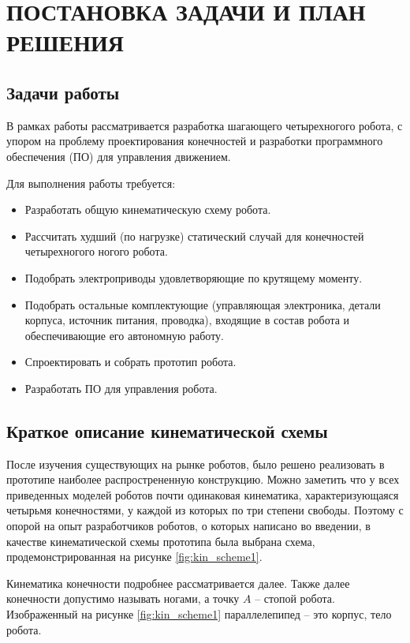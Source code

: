 \chapter{\MakeUppercase{Постановка задачи и план решения}}

\section{Задачи работы}

В рамках работы рассматривается разработка шагающего четырехногого робота, с упором на проблему проектирования конечностей и разработки программного обеспечения (ПО) для управления движением.

Для выполнения работы требуется:
\begin{itemize}
    \item Разработать общую кинематическую схему робота.
    \item Рассчитать худший (по нагрузке) статический случай для конечностей четырехногого ногого робота.
    \item Подобрать электроприводы удовлетворяющие по крутящему моменту.
    \item Подобрать остальные комплектующие (управляющая электроника, детали корпуса, источник питания, проводка), входящие в состав робота и обеспечивающие его автономную работу.
    \item Спроектировать и собрать прототип робота.
    \item Разработать ПО для управления робота.
\end{itemize}

\section{Краткое описание кинематической схемы}

После изучения существующих на рынке роботов, было решено реализовать в прототипе наиболее распрострененную конструкцию. Можно заметить что у всех приведенных моделей роботов почти одинаковая кинематика, характеризующаяся четырьмя конечностями, у каждой из которых по три степени свободы. Поэтому с опорой на опыт разработчиков роботов, о которых написано во введении, в качестве кинематической схемы прототипа была выбрана схема, продемонстрированная на рисунке \ref{fig:kin_scheme1}. 

Кинематика конечности подробнее рассматривается далее. Также далее конечности допустимо называть ногами, а точку $ A $ -- стопой робота. Изображенный на рисунке \ref{fig:kin_scheme1} параллелепипед -- это корпус, тело робота.

